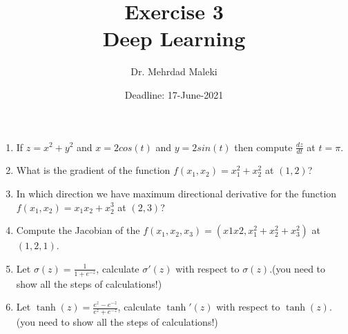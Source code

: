 \documentclass[12pt,a4paper]{article} %
\title{Exercise 3\\ Deep Learning}
\author{Dr. Mehrdad Maleki}
\date{Deadline: 17-June-2021}
\begin{document}
\maketitle
\begin{enumerate}

\item If $z=x^2+y^2$ and $x=2cos(t)$ and $y=2sin(t)$ then compute $\frac{dz}{dt}$ at $t=\pi$.
\item What is the gradient of the function $f(x_1,x_2)=x_1^2+x_2^2$ at $(1,2)$?
\item In which direction we have maximum directional derivative for the function $f(x_1,x_2)=x_1x_2+x_2^3$ at $(2,3)$?
\item Compute the Jacobian of the $f(x_1,x_2,x_3)=(x1x2,x_1^2+x_2^2+x_3^2)$ at $(1,2,1)$.

\item  Let $\sigma(z) =\frac{1}{1+e^{-z}}$, calculate $\sigma'(z)$ with respect to $\sigma(z)$.(you need to show all the steps of calculations!)

\item  Let $\tanh (z) =\frac{e^z-e^{-z}}{e^z+e^{-z}}$, calculate $\tanh'(z)$ with respect to $\tanh(z)$. (you need to show all the steps of calculations!)

\end{enumerate}
\end{document}
